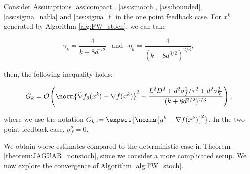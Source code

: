         \begin{theorem}
        \label{theorem:JAGUAR}
            Consider Assumptions \ref{ass:compact}, \ref{ass:smooth}, \ref{ass:bounded}, \ref{ass:sigma_nabla} and \ref{ass:sigma_f} in the one point feedback case. For $x^k$ generated by Algorithm \ref{alg:FW_stoch}, we can take  
            
            $$\gamma_k = \frac{4}{k + 8d^{3/2}} ~~\text{ and }~~ \eta_k = \frac{4}{(k + 8d^{3/2})^{2/3}},$$
    
            then, the following inequality holds:



            \begin{equation*}
                G_k
                =
                \mathcal{O} \left(\norm{\widetilde{\nabla}f_{\delta}(x^k) - \nabla f(x^k)}^2
                +\frac{L^2 D^2 + d^2 \sigma_f^2/ \tau^2 + d^2 \sigma_{\nabla}^2}{(k + 8d^{3/2})^{2/3}} 
                \right),
            \end{equation*}
    
            where we use the notation $G_k := \expect{\norms{g^k - \nabla f(x^k)}^2}$. In the two point feedback case, $\sigma^2_f = 0$.
            
        \end{theorem}
    
        We obtain worse estimates compared to the deterministic case in Theorem \ref{theorem:JAGUAR_nonstoch}, since we consider a more complicated setup. We now explore the convergence of Algorithm \ref{alg:FW_stoch}.

